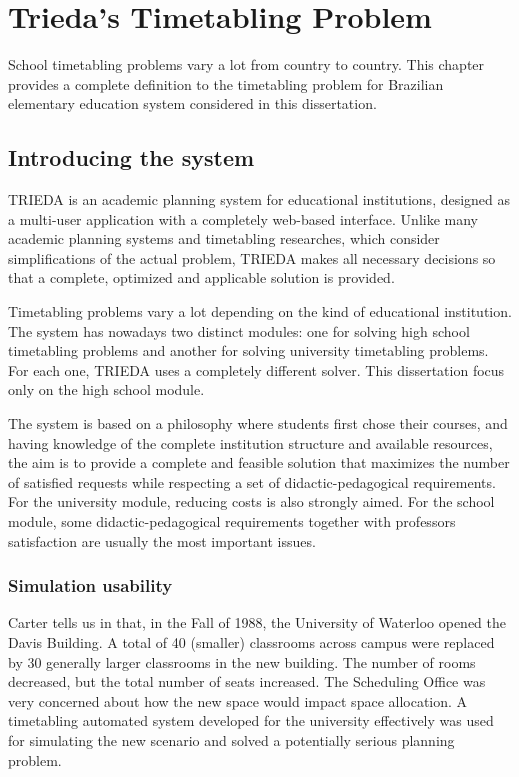 \chapter{Trieda's Timetabling Problem}
\label{chap:timetabling}


School timetabling problems vary a lot from country to country. This chapter provides a complete definition to the timetabling problem for Brazilian elementary education system considered in this dissertation.



\section{Introducing the system}
\label{sec:system}


TRIEDA is an academic planning system for educational institutions, designed as a multi-user application with a completely web-based interface. Unlike many academic planning systems and timetabling researches, which consider simplifications of the actual problem, TRIEDA makes all necessary decisions so that a complete, optimized and applicable solution is provided.

Timetabling problems vary a lot depending on the kind of educational institution. The system has nowadays two distinct modules: one for solving high school timetabling problems and another for solving university timetabling problems. For each one, TRIEDA uses a completely different solver. This dissertation focus only on the high school module.

The system is based on a  philosophy where students first chose their courses, and having knowledge of the complete institution structure and available resources, the aim is to provide a complete and feasible solution that maximizes the number of satisfied requests while respecting a set of didactic-pedagogical requirements. For the university module, reducing costs is also strongly aimed. For the school module, some didactic-pedagogical requirements together with professors satisfaction are usually the most important issues.


\subsection{Simulation usability}
\label{subsec:simulation}

Carter tells us in \cite{Carter2001} that, in the Fall of 1988, the University of Waterloo opened the Davis Building. A total of 40 (smaller) classrooms across campus were replaced by 30 generally larger classrooms in the new building. The number of rooms decreased, but the total number of seats increased. The Scheduling Office was very concerned about how the new space would impact space allocation. A timetabling automated system developed for the university effectively was used for simulating the new scenario and solved a potentially serious planning problem.

